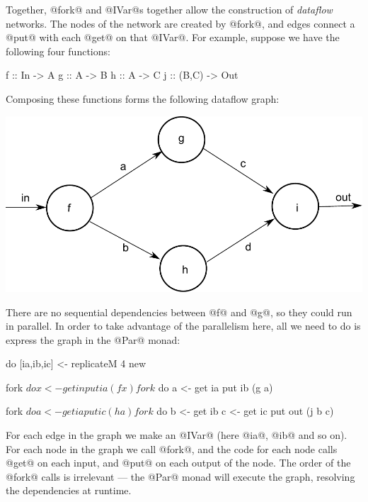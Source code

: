 Together, @fork@ and @IVar@s together allow the construction of
\emph{dataflow} networks.  The nodes of the network are created by
@fork@, and edges connect a @put@ with each @get@ on that @IVar@.  For
example, suppose we have the following four functions:

\begin{haskell}
f :: In -> A
g :: A -> B
h :: A -> C
j :: (B,C) -> Out
\end{haskell}

\noindent Composing these functions forms the following dataflow graph:

\begin{center}
\includegraphics[scale=0.6]{dataflow.pdf}
\end{center}

There are no sequential dependencies between @f@ and @g@, so they
could run in parallel.  In order to take advantage of the parallelism
here, all we need to do is express the graph in the @Par@ monad:

\begin{haskell}
do
   [ia,ib,ic] <- replicateM 4 new

   fork $ do x <- get in
             put ia (f x)

   fork $ do a <- get ia
             put ib (g a)

   fork $ do a <- get ia
             put ic (h a)

   fork $ do b <- get ib
             c <- get ic
             put out (j b c)
\end{haskell}

\noindent For each edge in the graph we make an @IVar@ (here @ia@,
@ib@ and so on).  For each node in the graph we call @fork@, and the
code for each node calls @get@ on each input, and @put@ on each output
of the node.  The order of the @fork@ calls is irrelevant --- the
@Par@ monad will execute the graph, resolving the dependencies at
runtime.

